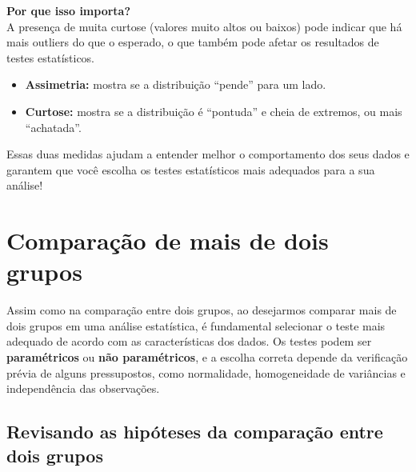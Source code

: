 \documentclass[
]{book}
\providecommand{\tightlist}{%
  \setlength{\itemsep}{0pt}\setlength{\parskip}{0pt}}
\begin{document}
\textbf{Por que isso importa?}\\
A presença de muita curtose (valores muito altos ou baixos) pode indicar que há mais outliers do que o esperado, o que também pode afetar os resultados de testes estatísticos.

\begin{itemize}
\tightlist
\item
  \textbf{Assimetria:} mostra se a distribuição ``pende'' para um lado.
\item
  \textbf{Curtose:} mostra se a distribuição é ``pontuda'' e cheia de extremos, ou mais ``achatada''.
\end{itemize}

Essas duas medidas ajudam a entender melhor o comportamento dos seus dados e garantem que você escolha os testes estatísticos mais adequados para a sua análise!

\chapter{Comparação de mais de dois grupos}\label{comparauxe7uxe3o-de-mais-de-dois-grupos}

Assim como na comparação entre dois grupos, ao desejarmos comparar mais de dois grupos em uma análise estatística, é fundamental selecionar o teste mais adequado de acordo com as características dos dados. Os testes podem ser \textbf{paramétricos} ou \textbf{não paramétricos}, e a escolha correta depende da verificação prévia de alguns pressupostos, como normalidade, homogeneidade de variâncias e independência das observações.

\section{Revisando as hipóteses da comparação entre dois grupos}\label{revisando-as-hipuxf3teses-da-comparauxe7uxe3o-entre-dois-grupos}
\end{document}
